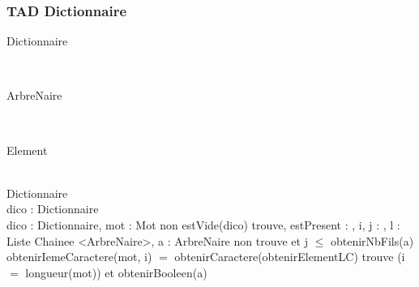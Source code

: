 \subsubsection{TAD Dictionnaire}
	\begin{algorithme}
		\begin{enregistrement}{Dictionnaire}
		\end{enregistrement}\\
		
		\begin{enregistrement}{ArbreNaire}
		\end{enregistrement}\\
		
		\begin{enregistrement}{Element}
		\end{enregistrement}\\
		
		{}%
		{Dictionnaire}%
		{}%
		{}\\
		
		{dico : Dictionnaire}%
		{\booleen}%
		{}%
		{}\\
		
		{dico : Dictionnaire, mot : Mot}%
		{\booleen}%
		{non estVide(dico)}
		{trouve, estPresent : \booleen, i, j : \naturel, l : Liste Chainee <ArbreNaire>, a : ArbreNaire}%
		{%
		\tantque%
			{non trouve et j $\leq$ obtenirNbFils(a)}%
			{\sialorssinon%
				{obtenirIemeCaractere(mot, i) $=$ obtenirCaractere(obtenirElementLC)}
				{}
				{
				}
			}%
		\sialors%
			{trouve}
			{\sialors%
				{(i $=$ longueur(mot)) et obtenirBooleen(a)}
				{}
			}
		}\\
		

\end{algorithme}
